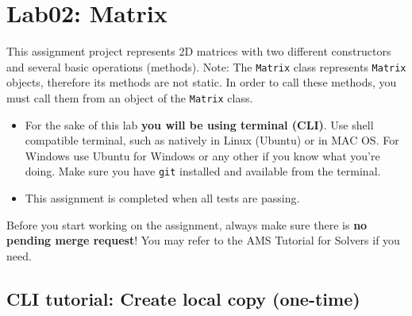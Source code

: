 \chapter{Lab02: Matrix}\label{apx:lab02}

This assignment project represents 2D matrices with two different constructors and several basic operations (methods). Note: The \texttt{Matrix} class represents \texttt{Matrix} objects, therefore its methods are not static. In order to call these methods, you must call them from an object of the \texttt{Matrix} class.

\begin{itemize}
\item
  For the sake of this lab \textbf{you will be using terminal (CLI)}. Use shell compatible terminal, such as natively in Linux (Ubuntu) or in MAC OS. For Windows use Ubuntu for Windows or any other if you know what you're doing. Make sure you have \texttt{git} installed and available from the terminal.
\item
  This assignment is completed when all tests are passing.
\end{itemize}

Before you start working on the assignment, always make sure there is \textbf{no pending merge request}! You may refer to the AMS Tutorial for Solvers if you need.

\section{CLI tutorial: Create local copy (one-time)}\label{cli-tutorial-create-local-copy-one-time}

